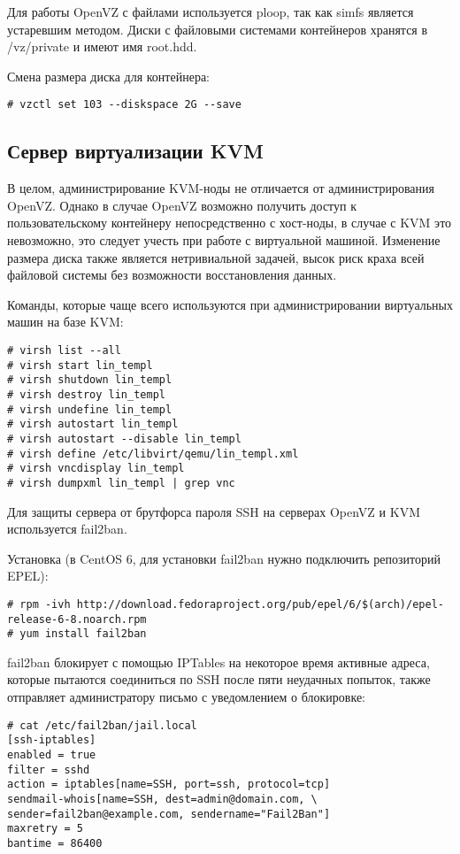 Для работы OpenVZ с файлами используется ploop, так как simfs является устаревшим методом.
Диски с файловыми системами контейнеров хранятся в /vz/private и имеют имя root.hdd.

Смена размера диска для контейнера:
\begin{lstlisting}
# vzctl set 103 --diskspace 2G --save
\end{lstlisting}

\subsection{Сервер виртуализации KVM}

В целом, администрирование KVM-ноды не отличается от администрирования OpenVZ.
Однако в случае OpenVZ возможно получить доступ к пользовательскому контейнеру непосредственно с хост-ноды, в случае с KVM это невозможно, это следует учесть при работе с виртуальной машиной.
Изменение размера диска также является нетривиальной задачей, высок риск краха всей файловой системы без возможности восстановления данных.

Команды, которые чаще всего используются при администрировании виртуальных машин на базе KVM:
\begin{lstlisting}
# virsh list --all
# virsh start lin_templ
# virsh shutdown lin_templ
# virsh destroy lin_templ
# virsh undefine lin_templ
# virsh autostart lin_templ
# virsh autostart --disable lin_templ
# virsh define /etc/libvirt/qemu/lin_templ.xml
# virsh vncdisplay lin_templ
# virsh dumpxml lin_templ | grep vnc
\end{lstlisting}

Для защиты сервера от брутфорса пароля SSH на серверах OpenVZ и KVM используется fail2ban.

Установка (в CentOS 6, для установки fail2ban нужно подключить репозиторий EPEL):
\begin{lstlisting}
# rpm -ivh http://download.fedoraproject.org/pub/epel/6/$(arch)/epel-release-6-8.noarch.rpm
# yum install fail2ban
\end{lstlisting}

fail2ban блокирует с помощью IPTables на некоторое время активные адреса, которые пытаются соединиться по SSH после пяти неудачных попыток, также отправляет администратору письмо с уведомлением о блокировке:
\begin{lstlisting}
# cat /etc/fail2ban/jail.local
[ssh-iptables]
enabled = true
filter = sshd
action = iptables[name=SSH, port=ssh, protocol=tcp]
sendmail-whois[name=SSH, dest=admin@domain.com, \
sender=fail2ban@example.com, sendername="Fail2Ban"]
maxretry = 5
bantime = 86400
\end{lstlisting}

